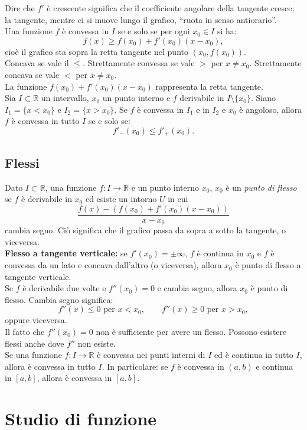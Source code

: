 \documentclass[12pt,a4paper]{article}
\let\oldsection\section
\renewcommand{\section}{\clearpage\oldsection}
\begin{document}
Dire che $f'$ è crescente significa che il coefficiente angolare della tangente cresce; la tangente, mentre ci si muove lungo il grafico, ``ruota in senso antiorario''.\\
Una funzione $f$ è convessa in $I$ se e solo se per ogni $x_0 \in I$ si ha:
\[
f(x) \ge f(x_0) + f'(x_0)(x - x_0),
\]
cioè il grafico sta sopra la retta tangente nel punto $(x_0, f(x_0))$.\\
Concava se vale il $\le$.  
Strettamente convessa se vale $>$ per $x \ne x_0$.  
Strettamente concava se vale $<$ per $x \ne x_0$.\\
La funzione $f(x_0) + f'(x_0)(x - x_0)$ rappresenta la retta tangente.\\
Sia $I \subset \mathbb{R}$ un intervallo, $x_0$ un punto interno e $f$ derivabile in $I \setminus \{x_0\}$.  
Siano $I_1 = \{x < x_0\}$ e $I_2 = \{x > x_0\}$.  
Se $f$ è convessa in $I_1$ e in $I_2$ e $x_0$ è angoloso, allora $f$ è convessa in tutto $I$ se e solo se:
\[
f'_-(x_0) \le f'_+(x_0).
\]

\subsection{Flessi}
Dato $I \subset \mathbb{R}$, una funzione $f : I \to \mathbb{R}$ e un punto interno $x_0$,  
$x_0$ è un \emph{punto di flesso} se $f$ è derivabile in $x_0$ ed esiste un intorno $U$ in cui
\[
\frac{f(x) - (f(x_0) + f'(x_0)(x - x_0))}{x - x_0}
\]
cambia segno.  
Ciò significa che il grafico passa da sopra a sotto la tangente, o viceversa.\\
\textbf{Flesso a tangente verticale: }  
se $f'(x_0)=\pm\infty$, $f$ è continua in $x_0$ e $f$ è convessa da un lato e concava dall'altro (o viceversa),  
allora $x_0$ è punto di flesso a tangente verticale.\\
Se $f$ è derivabile due volte e $f''(x_0)=0$ e cambia segno, allora $x_0$ è punto di flesso.  
Cambia segno significa:
\[
f''(x) \le 0 \text{ per } x<x_0, \qquad f''(x)\ge 0 \text{ per } x>x_0,
\]
oppure viceversa.\\
Il fatto che $f''(x_0)=0$ non è sufficiente per avere un flesso.  
Possono esistere flessi anche dove $f''$ non esiste.\\
Se una funzione $f : I \to \mathbb{R}$ è convessa nei punti interni di $I$ ed è continua in tutto $I$, allora è convessa in tutto $I$.  
In particolare: se $f$ è convessa in $(a,b)$ e continua in $[a,b]$, allora è convessa in $[a,b]$.

\section{Studio di funzione}
\end{document}
